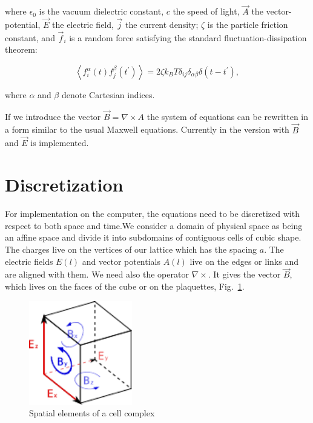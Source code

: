 where $\epsilon_0$ is the vacuum dielectric constant, $c$ the speed of
light, $\vec A$ the vector-potential, $\vec E$ the electric field,
$\vec j$ the current density; $\zeta$ is the particle friction
constant, and $\vec f_i$ is a random force satisfying the standard
fluctuation-dissipation theorem:

\begin{equation}
\left< f_i^\alpha (t) f_j^\beta (t^\prime) \right> =
2 \zeta k_B T \delta_{ij} \delta_{\alpha \beta}
\delta (t - t^\prime),
\end{equation}

where $\alpha$ and $\beta$ denote Cartesian indices.

If we introduce the vector $\vec B=\nabla\times A$ the system of
equations can be rewritten in a form similar to the usual Maxwell
equations. Currently in {\es} the version with $\vec B$ and $\vec E$
is implemented.

\section{Discretization}

For implementation on the computer, the equations need to be
discretized with respect to both space and time.We consider a domain
of physical space as being an affine space and divide it into
subdomains of contiguous cells of cubic shape. The charges live on the
vertices of our lattice which has the spacing $a$. The electric fields
$E(l)$ and vector potentials $A(l)$ live on the edges or links and are
aligned with them. We need also the operator $\nabla\times{}$. It
gives the vector $\vec B$, which lives on the faces of the cube or on
the plaquettes, Fig.~\ref{fig:cellstructure}.

\begin{figure}[ht]
  \centering
  \includegraphics[width=0.4\textwidth]{figures/maggs-rotation}
  \caption{Spatial elements of a cell complex}
  \label{fig:cellstructure}  
\end{figure}

